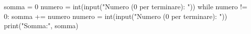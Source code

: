 \begin{unipdcode}[language=Python]
somma = 0
numero = int(input("Numero (0 per terminare): "))
while numero != 0:
    somma += numero
    numero = int(input("Numero (0 per terminare): "))
print("Somma:", somma)
\end{unipdcode}
